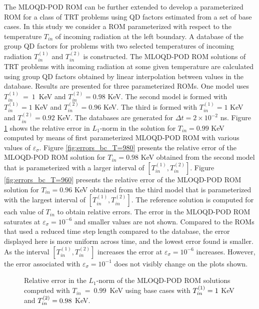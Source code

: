 	\ind The MLOQD-POD ROM can be further extended to develop a parameterized ROM for a class of TRT problems using QD factors estimated from a set of base cases. In this study we consider a ROM parameterized with respect to the temperature $T_{in}$ of incoming radiation at the left boundary. A database of the group QD factors for problems with two selected temperatures of incoming radiation  $T_{in}^{(1)}$ and $T_{in}^{(2)}$ is constructed. The MLOQD-POD ROM solutions of TRT problems with incoming radiation at some given temperature are calculated using group QD factors obtained by linear interpolation between values in the database. Results are presented for three parameterized ROMs. One model uses $T_{in}^{(1)}~=~1$~KeV and $T_{in}^{(2)}=0.98$ KeV. The second model is formed with  $T_{in}^{(1)}=1$ KeV and $T_{in}^{(2)}=0.96$ KeV. The third is formed with  $T_{in}^{(1)}=1$ KeV and $T_{in}^{(2)}=0.92$ KeV. The databases are generated for $\Delta t = 2\times10^{-2}$ ns. Figure \ref{fig:errors_bc_T=990} shows  the  relative error in $L_1$-norm in the solution  for $T_{in}=0.99$ KeV computed by means of first parameterized MLOQD-POD ROM with various values of $\varepsilon_{\sigma}$. Figure \ref{fig:errors_bc_T=980} presents the relative error of the MLOQD-POD ROM solution  for $T_{in}= 0.98$ KeV obtained from the second model that is parameterized with a larger interval of  $[T_{in}^{(1)},T_{in}^{(2)}]$. Figure \ref{fig:errors_bc_T=960} presents the relative error of the MLOQD-POD ROM solution  for $T_{in}= 0.96$ KeV obtained from the third model that is parameterized with the largest interval of  $[T_{in}^{(1)},T_{in}^{(2)}]$. The reference solution is computed for each value of $T_{in}$ to obtain relative errors. The error in the MLOQD-POD ROM saturates at $\varepsilon_\sigma=10^{-6}$ and smaller values are not shown. Compared to the ROMs that used a reduced time step length compared to the database, the error displayed here is more uniform across time, and the lowest error found is smaller. As the interval $[T_{in}^{(1)},T_{in}^{(2)}]$ increases the error at $\varepsilon_\sigma=10^{-6}$ increases. However, the error associated with $\varepsilon_\sigma=10^{-1}$ does not visibly change on the plots shown.
	
	\begin{figure}[ht!]
		\centering
		\caption{\label{fig:errors_bc_T=990}
			Relative error in the $L_1$-norm of the MLOQD-POD ROM solutions computed with $T_{in}~=~0.99$~KeV using base cases with $T_{in}^{\left(1\right)}=1$ KeV  and $T_{in}^{\left(2\right)}=0.98$ KeV. }
	\end{figure}

